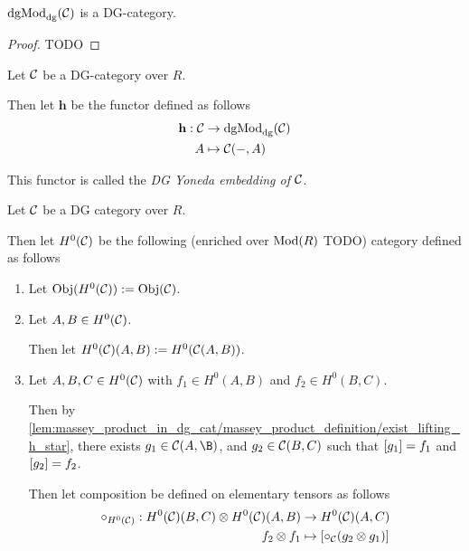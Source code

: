 \begin{proposition}
    \( \operatorname{dgMod}_{\operatorname{dg}}({\mathcal{C}}) \) is a DG-category.
\end{proposition}
\begin{proof}
    TODO
\end{proof}

\begin{definition}
    \label{def:DG_Yoneda_embedding}
    Let \( {\mathcal{C}} \) be a DG-category over \( R \).
    
    Then let \( \mathbf{h} \) be the functor defined as follows
    \begin{align*}
        \mathbf{h}: {\mathcal{C}} &\to \operatorname{dgMod}_{\operatorname{dg}}({\mathcal{C}}) \\
        A &\mapsto {\mathcal{C}}(-, A)
    \end{align*}

    This functor is called the \emph{DG Yoneda embedding of \( {\mathcal{C}} \)}.
\end{definition}


\begin{definition}
    Let \( {\mathcal{C}} \) be a DG category over \( R \).

    Then let \( H^0({\mathcal{C}}) \) be the following (enriched over \( \operatorname{Mod}(R) \) TODO) category defined as follows
    \begin{enumerate}
        \item {
            Let \( \operatorname{Obj}(H^0({\mathcal{C}})) := \operatorname{Obj}({\mathcal{C}}) \).
        }
        \item {
            Let \( A, B \in H^0({\mathcal{C}}) \).

            Then let \( H^0({\mathcal{C}})(A, B) := H^0({\mathcal{C}}(A, B)) \).
        }
        \item {
            Let \( A, B, C \in H^0({\mathcal{C}}) \) with \( f_1 \in H^0(A, B) \) and \( f_2 \in H^0(B, C) \).

            Then by \autoref{lem:massey_product_in_dg_cat/massey_product_definition/exist_lifting_h_star}, there exists \( g_1 \in \Cc(A, \B) \), and \( g_2 \in {\mathcal{C}}(B, C) \) such that \( \left[ g_1 \right] = f_1 \) and \( \left[ g_2 \right] = f_2 \).

            Then let composition be defined on elementary tensors as follows
            \begin{align*}
                \circ_{H^0({\mathcal{C}})}: H^0({\mathcal{C}})(B, C) \otimes H^0({\mathcal{C}})(A, B) &\to H^0({\mathcal{C}})(A, C) \\
                f_2 \otimes f_1 &\mapsto \left[  \circ_{{\mathcal{C}}}(g_2 \otimes g_1)  \right]
            \end{align*}
        }
    \end{enumerate}
\end{definition}

